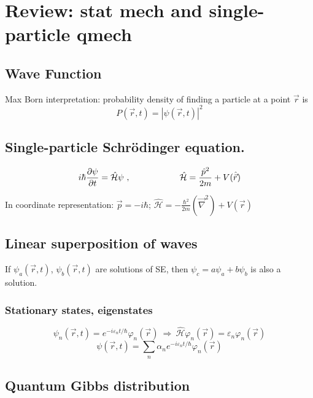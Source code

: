 \documentclass[10pt]{article}
\date{\today}
\newcommand{\Ham}{\hat{\mathcal{H}}}
\renewcommand{\grad}{\vec \nabla}
\newcommand{\smallspace}{\hspace{2cm}}
\begin{document}
\section{Review: stat mech and single-particle qmech}

\subsection{Wave Function}
Max Born interpretation: probability density of finding a particle at a point $\vec r$ is
$$
P(\vec r, t) = \left|\psi(\vec r, t)\right|^2
$$
\subsection{Single-particle Schr\"odinger equation.}

$$
i\hbar \pdv{\psi}{t} = \Ham \psi \ , \smallspace \Ham = \frac{\hat p^2}{2m} + V(\hat{\vec r})
$$

In coordinate representation: $\vec p = -i\hbar $; $\Ham = -\frac{\hbar^2}{2m}(\grad^2)+V(\vec r)$
\subsection{Linear superposition of waves}
If $\psi_a(\vec r, t)$, $\psi_b(\vec r, t)$ are solutions of SE, then $\psi_c =  a\psi_a + b\psi_b$ is also a solution.

\subsubsection{Stationary states, eigenstates}
$$
\psi_n(\vec r, t) = e^{-i\varepsilon_n t/\hbar}\varphi_n(\vec r) \ \Rightarrow \ \Ham \varphi_n(\vec r) = \varepsilon_n \varphi_n(\vec r)
$$
$$
\psi(\vec r, t) = \sum_n \alpha_n e^{-i\varepsilon_n t/\hbar} \varphi_n(\vec r)
$$

\subsection{Quantum Gibbs distribution}
\end{document}
